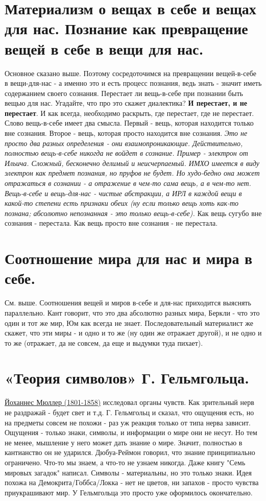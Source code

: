 \section{ Материализм о вещах в себе и вещах для нас. Познание как превращение вещей в себе в вещи для нас.}
Основное сказано выше. Поэтому сосредоточимся на превращении вещей-в-себе в вещи-для-нас - а именно это и есть процесс познания, ведь знать - значит иметь содержанием своего сознания. Перестает ли вещь-в-себе при познании быть вещью для нас. Угадайте, что про это скажет диалектика? \textbf{И перестает, и не перестает}. И как всегда, необходимо раскрыть, где перестает, где не перестает. Слово вещь-в-себе имеет два смысла. Первый - вещь, которая находится только вне сознания. Второе - вещь, которая просто находится вне сознания. \textit{Это не просто два разных определения - они взаимопроникающие. Действительно, полностью вещь-в-себе никогда не войдет в сознание. Пример - электрон от Ильича. Сложный, бесконечно делимый и неисчерпаемый. ИМХО имеется в виду электрон как предмет познания, но пруфов не будет. Но худо-бедно она может отражаться в сознании - а отражение в чем-то сама вещь, а в чем-то нет. Вещь-в-себе и вещь-для-нас - чистые абстракции, а ИРЛ в каждой вещи в какой-то степени есть признаки обеих (ну если только вещь хоть как-то познана; абсолютно непознанная - это только вещь-в-себе).} Как вещь сугубо вне сознания - перестала. Как вещь просто вне сознания - не перестала.

\section{ Соотношение мира для нас и мира в себе.}
См. выше. Соотношения вещей и миров в-себе и для-нас приходится выяснять параллельно. Кант говорит, что это два абсолютно разных мира, Беркли - что это один и тот же мир, Юм как всегда не знает. Последовательный материалист же скажет, что эти миры - и одно и то же (ну один же отражает другой), и не одно и то же (отражает, да не совсем, да еще и выдумки туда пихает).

\section{ «Теория символов» Г. Гельмгольца.}
\underline{Йоханнес Мюллер (1801-1858)} исследовал органы чувств. Как зрительный нерв не раздражай - будет свет и т.д. 
Г. Гельмгольц и сказал, что ощущения есть, но на предметы совсем не похожи - раз уж реакция только от типа нерва зависит. Ощущения - только знаки, символы, и информации о мире они не несут. Но тем не менее, мышление у него может дать знание о мире. Значит, полностью в кантианство он не ударился. Дюбуа-Реймон говорил, что знание принципиально ограничено. Что-то мы знаем, а что-то не узнаем никогда. Даже книгу "Семь мировых загадок" написал. Символы - материальны, но это только знаки. Идея  похожа на Демокрита/Гоббса/Локка - нет не цветов, ни запахов - просто чувства приукрашивают мир. У Гельмгольца это просто уже оформилось окончательно.


